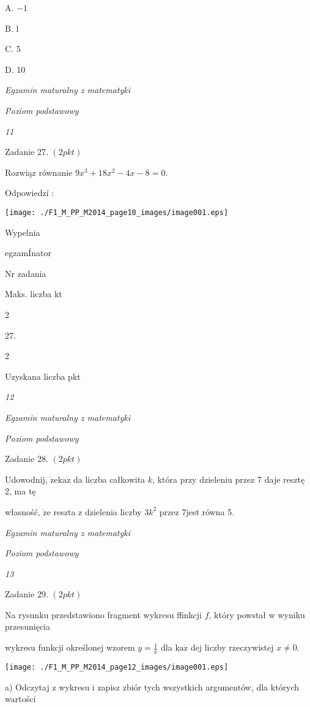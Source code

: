 \documentclass[a4paper,12pt]{article}
\begin{document}
A. $-1$

B. l

C. 5

D. 10





{\it Egzamin maturalny z matematyki}

{\it Poziom podstawowy}

{\it 11}

Zadanie 27. $(2pkt)$

Rozwiąz równanie $9x^{3}+18x^{2}-4x-8=0.$

Odpowiedzí :
\begin{center}
\texttt{[image: ./F1\_M\_PP\_M2014\_page10\_images/image001.eps]}
\end{center}
Wypelnia

egzamÍnator

Nr zadania

Maks. liczba kt

2

27.

2

Uzyskana liczba pkt





{\it 12}

{\it Egzamin maturalny z matematyki}

{\it Poziom podstawowy}

Zadanie 28. $(2pkt)$

Udowodnij, $\dot{\mathrm{z}}\mathrm{e}\mathrm{k}\mathrm{a}\dot{\mathrm{z}}$ da liczba całkowita $k$, która przy dzieleniu przez 7 daje resztę 2, ma tę

własność, $\dot{\mathrm{z}}\mathrm{e}$ reszta z dzielenia liczby $3k^{2}$ przez $7$jest równa 5.





{\it Egzamin maturalny z matematyki}

{\it Poziom podstawowy}

{\it 13}

Zadanie 29. $(2pkt)$

Na rysunku przedstawiono fragment wykresu ffinkcji $f$, który powstał w wyniku przesunięcia

wykresu funkcji określonej wzorem $y=\displaystyle \frac{1}{x}$ dla $\mathrm{k}\mathrm{a}\dot{\mathrm{z}}$ dej liczby rzeczywistej $x\neq 0.$
\begin{center}
\texttt{[image: ./F1\_M\_PP\_M2014\_page12\_images/image001.eps]}
\end{center}
a) Odczytaj z wykresu i zapisz zbiór tych wszystkich argumentów, dla których wartości
\end{document}
